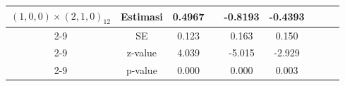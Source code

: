 \begin{enumerate}[label=\alph*.]
\begin{longtable}{|c|c|c|c|c|c|c|c|c|}
            \multirow{4}{*}{$(1,0,0)\times(2,1,0)_{12}$}
            & Estimasi & 0.4967 & {} & -0.8193 & -0.4393 & {} & {} & {}\\ \cline{2-9}
            & SE       & 0.123 & {} & 0.163 & 0.150 & {} & {} & {}\\ \cline{2-9}
            & z-value  & 4.039 & {} & -5.015 & -2.929 & {} & {}& {}\\ \cline{2-9}
            & p-value  & 0.000 & {} & 0.000 & 0.003 & {} & {} & {}\\ \hline
        \end{longtable}
        \normalsize
\end{enumerate}
